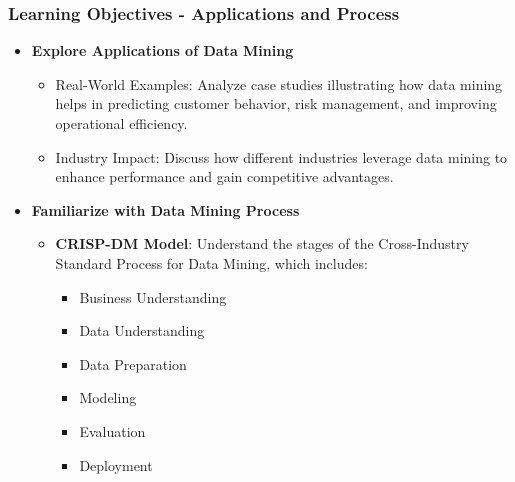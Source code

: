 \documentclass{beamer}
\begin{document}
\begin{frame}[fragile]
    \frametitle{Learning Objectives - Applications and Process}
    \begin{itemize}
        \item \textbf{Explore Applications of Data Mining}
            \begin{itemize}
                \item Real-World Examples: Analyze case studies illustrating how data mining helps in predicting customer behavior, risk management, and improving operational efficiency.
                \item Industry Impact: Discuss how different industries leverage data mining to enhance performance and gain competitive advantages.
            \end{itemize}
        \item \textbf{Familiarize with Data Mining Process}
            \begin{itemize}
                \item \textbf{CRISP-DM Model}: Understand the stages of the Cross-Industry Standard Process for Data Mining, which includes:
                \begin{itemize}
                    \item Business Understanding
                    \item Data Understanding
                    \item Data Preparation
                    \item Modeling
                    \item Evaluation
                    \item Deployment
                \end{itemize}
            \end{itemize}
    \end{itemize}
\end{frame}
\end{document}
